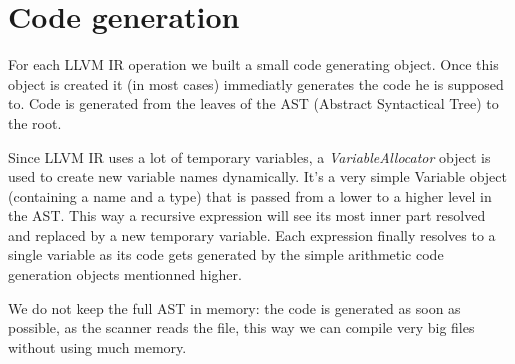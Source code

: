 \section{Code generation}
 
For each LLVM IR operation we built a small code generating object. Once this object is created it (in most cases) immediatly generates the code he is supposed to.
Code is generated from the leaves of the AST (Abstract Syntactical Tree) to the root.

Since LLVM IR uses a lot of temporary variables, a \emph{VariableAllocator} object is used to create new variable names dynamically.
It's a very simple Variable object (containing a name and a type) that is passed from a lower to a higher level in the AST.
This way a recursive expression will see its most inner part resolved and replaced by a new temporary variable. Each expression finally resolves to a single variable as its code gets generated by the simple arithmetic code generation objects mentionned higher.

We do not keep the full AST in memory: the code is generated as soon as possible, as the scanner reads the file, this way we can compile very big files without using much memory.

